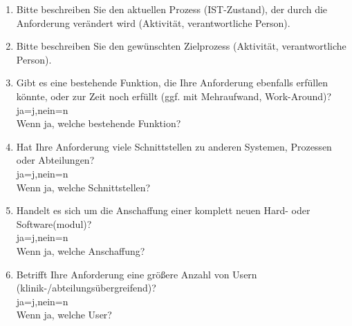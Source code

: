 \begin{Form}
\begin{enumerate}
  	\item Bitte beschreiben Sie den aktuellen Prozess (IST-Zustand), der durch die Anforderung verändert wird (Aktivität, verantwortliche Person). \\
  	\TextField[multiline, name=proces,width=0.9\textwidth,  height=2cm, value={}]{}
  
  \item Bitte beschreiben Sie den gewünschten Zielprozess (Aktivität, verantwortliche Person). \\ 
  \TextField[multiline, name=descrgoal,width=0.9\textwidth,  height=2cm, value={}]{}

	\item Gibt es eine bestehende Funktion, die Ihre Anforderung ebenfalls erfüllen könnte, oder zur Zeit noch erfüllt (ggf. mit Mehraufwand, Work-Around)? \\ \ChoiceMenu[radio, radiosymbol=6 default=n, width=0.5cm, name=func]{} {ja=j,nein=n} \\
	Wenn ja, welche bestehende Funktion? \\
	\TextField[multiline, name=jfunc,width=0.9\textwidth,  height=2cm, value={}]{}
	
	\item Hat Ihre Anforderung viele Schnittstellen zu anderen Systemen, Prozessen oder Abteilungen? \\ \ChoiceMenu[radio, radiosymbol=6 default=n, width=0.5cm, name=conse]{} {ja=j,nein=n} \\
	Wenn ja, welche Schnittstellen? \\
	\TextField[multiline, name=jconse,width=0.9\textwidth,  height=2cm, value={}]{}
	\newpage
	\item Handelt es sich um die Anschaffung einer komplett neuen Hard- oder Software(modul)? \\ \ChoiceMenu[radio, radiosymbol=6 default=n, width=0.5cm, name=soha]{} {ja=j,nein=n} \\
	Wenn ja, welche Anschaffung? \\
	\TextField[multiline, name=jsoja,width=0.9\textwidth,  height=2cm, value={}]{}
	
	\item Betrifft Ihre Anforderung eine größere Anzahl von Usern (klinik-/abteilungsübergreifend)? \\ \ChoiceMenu[radio, radiosymbol=6 default=n, width=0.5cm, name=user]{} {ja=j,nein=n} \\
	Wenn ja, welche User? \\
	\TextField[multiline, name=juser,width=0.9\textwidth,  height=2cm, value={}]{}
	

\end{enumerate}
\end{Form}
